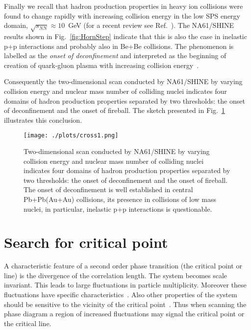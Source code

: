 \documentclass{PoS}
\begin{document}
Finally we recall that hadron production properties in heavy ion collisions were found to change 
rapidly with increasing
collision energy in the low SPS energy domain, $\sqrt{s_{NN}} \approx 10$~GeV
(for a recent review see Ref.~\cite{Gazdzicki:2014sva}). The NA61/SHINE results shown in
Fig.~\ref{fig:HornStep} indicate that this is also the case in 
inelastic p+p interactions and probably also in Be+Be collisions. The phenomenon is labelled
as the \textit{onset of deconfinement} and interpreted as the beginning of creation of
quark-gluon plasma with increasing collision energy~\cite{Gazdzicki:2010iv}. 

Consequently the two-dimensional scan conducted by NA61/SHINE by varying collision energy and nuclear
mass number of colliding nuclei indicates four domains of hadron production properties
separated by two thresholds: the onset of deconfinement and the onset of fireball.
The sketch presented in Fig.~\ref{fig:cross} illustrates this conclusion. 
	


\begin{figure}[h]
	\centering
	\texttt{[image: ./plots/cross1.png]}
	\caption[]
	{
	Two-dimensional scan conducted by NA61/SHINE by varying collision energy and nuclear
	mass number of colliding nuclei indicates four domains of hadron production properties
	separated by two thresholds: the onset of deconfinement and the onset of fireball.
	The onset of deconfinement is well established in central Pb+Pb(Au+Au) collisions,
	its presence in collisions of low mass nuclei, in particular, inelastic p+p interactions
	is questionable.
 	}
	\label{fig:cross}
\end{figure}


\clearpage

\section{Search for critical point}
\label{sec:critical}

A characteristic feature of a second order phase transition
(the critical point or line) is the
divergence of the correlation length.
The system becomes scale invariant. 
This leads to large fluctuations in particle multiplicity.
Moreover these fluctuations have specific 
characteristics~\mbox{\cite{Wosiek:1988,Bialas:1990xd}}.  
Also other properties of the system should be sensitive to the
vicinity of the critical point~\cite{Stephanov:1999zu}.
Thus when scanning the phase diagram a region of increased  
fluctuations may signal the critical point
or the critical line.
\end{document}
